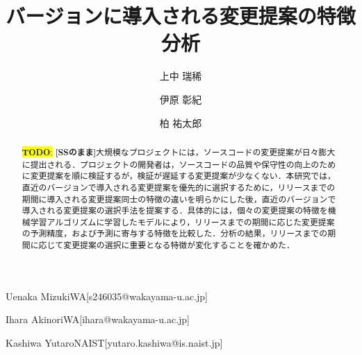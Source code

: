 \documentclass[submit,ses,noauthor]{ipsj}
\newcommand{\todo}[1]{\colorbox{yellow}{{\bf TODO}:}{\color{red} {\textbf{[#1]}}}}
\begin{document}
\title{バージョンに導入される変更提案の特徴分析}





\author{上中 瑞稀}{Uenaka Mizuki}{WA}[s246035@wakayama-u.ac.jp]
\author{伊原 彰紀}{Ihara Akinori}{WA}[ihara@wakayama-u.ac.jp]
\author{柏 祐太郎}{Kashiwa Yutaro}{NAIST}[yutaro.kashiwa@is.naist.jp]

\begin{abstract}
\todo{SSのまま}大規模なプロジェクトには，ソースコードの変更提案が日々膨大に提出される．プロジェクトの開発者は，ソースコードの品質や保守性の向上のために変更提案を順に検証するが，検証が遅延する変更提案が少なくない．本研究では，直近のバージョンで導入される変更提案を優先的に選択するために，リリースまでの期間に導入される変更提案同士の特徴の違いを明らかにした後，直近のバージョンで導入される変更提案の選択手法を提案する．具体的には，個々の変更提案の特徴を機械学習アルゴリズムに学習したモデルにより，リリースまでの期間に応じた変更提案の予測精度，および予測に寄与する特徴を比較した．分析の結果，リリースまでの期間に応じて変更提案の選択に重要となる特徴が変化することを確かめた．
\end{abstract}


%
%
%
\end{document}
